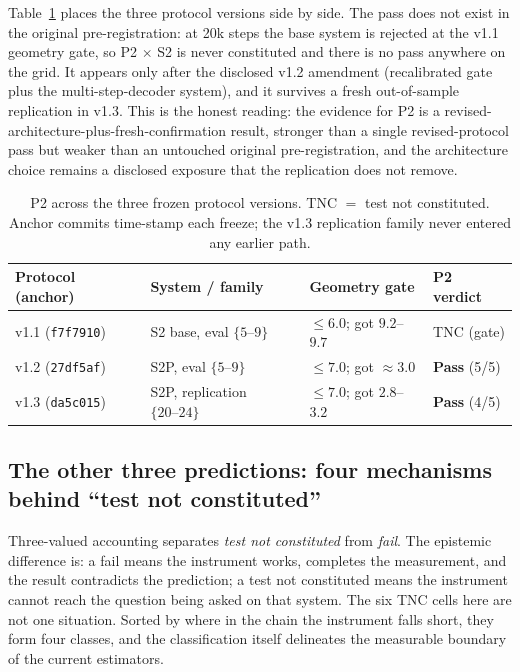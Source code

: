 \documentclass{article}
\begin{document}
Table~\ref{tab:threever} places the three protocol versions side by side. The
pass does not exist in the original pre-registration: at 20k steps the base
system is rejected at the v1.1 geometry gate, so P2 $\times$ S2 is never
constituted and there is no pass anywhere on the grid. It appears only after the
disclosed v1.2 amendment (recalibrated gate plus the multi-step-decoder system),
and it survives a fresh out-of-sample replication in v1.3. This is the honest
reading: the evidence for P2 is a revised-architecture-plus-fresh-confirmation
result, stronger than a single revised-protocol pass but weaker than an
untouched original pre-registration, and the architecture choice remains a
disclosed exposure that the replication does not remove.

\begin{table}[t]
\centering
\caption{P2 across the three frozen protocol versions. TNC $=$ test not
constituted. Anchor commits time-stamp each freeze; the v1.3 replication family
never entered any earlier path.}
\label{tab:threever}
\begin{tabular}{llll}
\toprule
Protocol (anchor) & System / family & Geometry gate & P2 verdict \\
\midrule
v1.1 (\texttt{f7f7910}) & S2 base, eval $\{5\text{--}9\}$ & $\le 6.0$; got $9.2$--$9.7$ & TNC (gate) \\
v1.2 (\texttt{27df5af}) & S2P, eval $\{5\text{--}9\}$ & $\le 7.0$; got $\approx 3.0$ & \textbf{Pass} (5/5) \\
v1.3 (\texttt{da5c015}) & S2P, replication $\{20\text{--}24\}$ & $\le 7.0$; got $2.8$--$3.2$ & \textbf{Pass} (4/5) \\
\bottomrule
\end{tabular}
\end{table}

\subsection{The other three predictions: four mechanisms behind ``test not
constituted''}
\label{sec:tnc}

Three-valued accounting separates \emph{test not constituted} from \emph{fail}.
The epistemic difference is: a fail means the instrument works, completes the
measurement, and the result contradicts the prediction; a test not constituted
means the instrument cannot reach the question being asked on that system. The
six TNC cells here are not one situation. Sorted by where in the chain the
instrument falls short, they form four classes, and the classification itself
delineates the measurable boundary of the current estimators.
\end{document}
